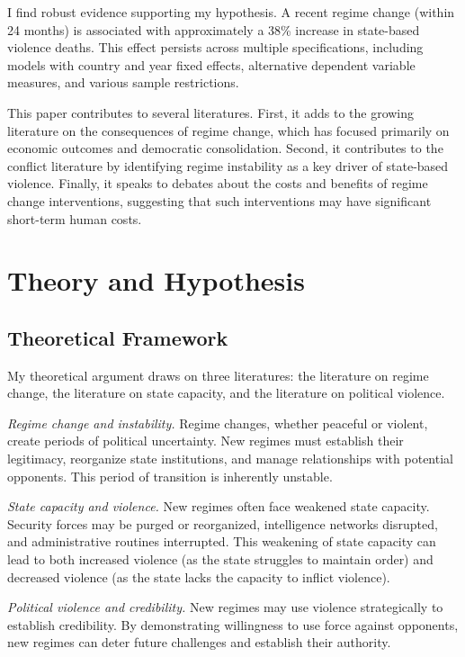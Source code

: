 \documentclass[12pt]{article}
\begin{document}
I find robust evidence supporting my hypothesis. A recent regime change (within 24 months) is associated with approximately a 38\% increase in state-based violence deaths. This effect persists across multiple specifications, including models with country and year fixed effects, alternative dependent variable measures, and various sample restrictions.

This paper contributes to several literatures. First, it adds to the growing literature on the consequences of regime change, which has focused primarily on economic outcomes and democratic consolidation. Second, it contributes to the conflict literature by identifying regime instability as a key driver of state-based violence. Finally, it speaks to debates about the costs and benefits of regime change interventions, suggesting that such interventions may have significant short-term human costs.

\section{Theory and Hypothesis}

\subsection{Theoretical Framework}

My theoretical argument draws on three literatures: the literature on regime change, the literature on state capacity, and the literature on political violence.

\textit{Regime change and instability.} Regime changes, whether peaceful or violent, create periods of political uncertainty. New regimes must establish their legitimacy, reorganize state institutions, and manage relationships with potential opponents. This period of transition is inherently unstable.

\textit{State capacity and violence.} New regimes often face weakened state capacity. Security forces may be purged or reorganized, intelligence networks disrupted, and administrative routines interrupted. This weakening of state capacity can lead to both increased violence (as the state struggles to maintain order) and decreased violence (as the state lacks the capacity to inflict violence).

\textit{Political violence and credibility.} New regimes may use violence strategically to establish credibility. By demonstrating willingness to use force against opponents, new regimes can deter future challenges and establish their authority.
\end{document}
